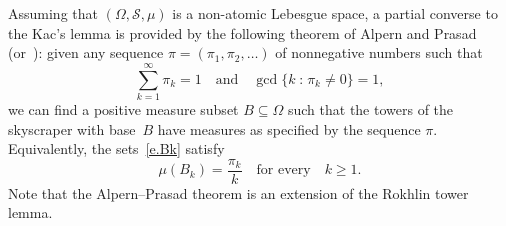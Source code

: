 \documentclass[AHL,Unicode,longabstracts,published]{cedram}
\DeclareMathOperator{\gcdd}{gcd}
\newcommand{\st}{\;\mathord{:}\;}
\newcommand{\clS}{\mathcal{S}}
\begin{document}
Assuming that $(\Omega,\clS,\mu)$ is a non-atomic Lebesgue space, a partial converse to the Kac's lemma is provided by the following theorem of Alpern and Prasad~\cite{AP_paper} (or~\cite[Theorem~A.1.4]{AP_book}): given any sequence $\pi = (\pi_1,\pi_2,\dots)$ of nonnegative numbers such that
\begin{equation}
\sum_{k=1}^\infty \pi_k = 1 \quad \text{and} \quad \gcdd\{k \st \pi_k \neq 0\} = 1,
\end{equation}
we can find a positive measure subset $B \subseteq \Omega$ such that the towers of the skyscraper with base~$B$ have measures as specified by the sequence $\pi$. Equivalently, the sets~\eqref{e.Bk} satisfy
\begin{equation}\label{e.AP}
\mu(B_k) = \frac{\pi_k}{k} \quad \text{for every}\quad k \ge 1.
\end{equation}
Note that the Alpern--Prasad theorem is an extension of the Rokhlin tower lemma.
\end{document}
